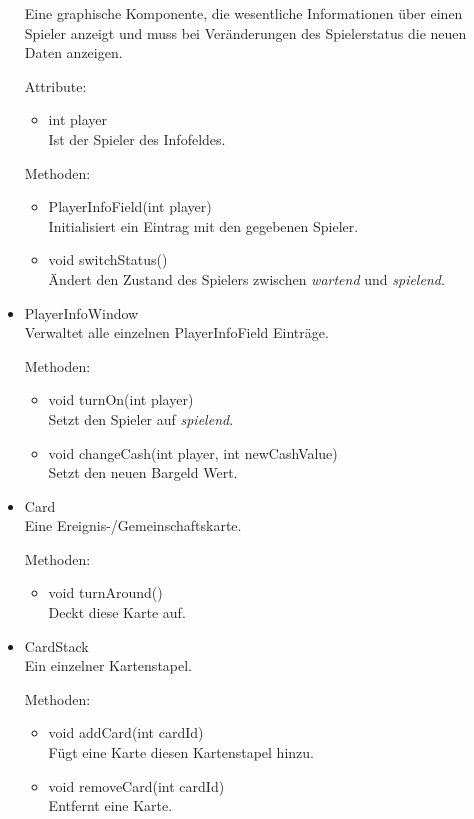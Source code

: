 \documentclass[a4paper,10pt]{article}
\begin{document}
\begin{itemize}
Eine graphische Komponente, die wesentliche Informationen über einen Spieler anzeigt und muss bei Veränderungen des Spielerstatus die neuen Daten anzeigen.

Attribute:
\begin{itemize}
\item int player \\
Ist der Spieler des Infofeldes.
\end{itemize}

Methoden:
\begin{itemize}
\item PlayerInfoField(int player) \\
Initialisiert ein Eintrag mit den gegebenen Spieler.
\item void switchStatus() \\
Ändert den Zustand des Spielers zwischen \textit{wartend} und \textit{spielend}.
\end{itemize}

\item PlayerInfoWindow \\
Verwaltet alle einzelnen PlayerInfoField Einträge.

Methoden:
\begin{itemize}
\item void turnOn(int player)
\\Setzt den Spieler auf \textit{spielend}.
\item void changeCash(int player, int newCashValue)
\\Setzt den neuen Bargeld Wert.
\end{itemize}

\item Card \\
Eine Ereignis-/Gemeinschaftskarte.

Methoden:
\begin{itemize}
\item void turnAround() \\
Deckt diese Karte auf.
\end{itemize}

\item CardStack\\
Ein einzelner Kartenstapel.

Methoden:
\begin{itemize}
\item void addCard(int cardId) \\
Fügt eine Karte diesen Kartenstapel hinzu.
\item void removeCard(int cardId) \\
Entfernt eine Karte.
\end{itemize}


\end{itemize}
\end{document}
